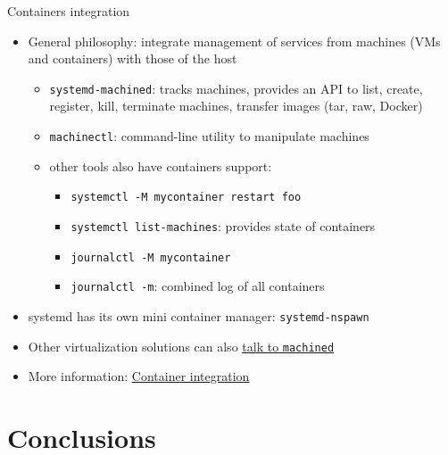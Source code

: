 \documentclass[11pt,final,usepdftitle=false]{beamer}
\begin{document}
\begin{frame}{Containers integration}
\begin{itemize}
	\item General philosophy: \alert{integrate management of services from machines (VMs and containers) with those of the host}
	\begin{itemize}
		\item \texttt{systemd-machined}: tracks machines, provides an API to list, create, register, kill, terminate machines, transfer images (tar, raw, Docker)
			\hbr
		\item \texttt{machinectl}: command-line utility to manipulate machines
			\hbr
		\item other tools also have containers support:
			\begin{itemize}
				\item \texttt{systemctl -M mycontainer restart foo}
				\item \texttt{systemctl list-machines}: provides state of containers
				\item \texttt{journalctl -M mycontainer}
				\item \texttt{journalctl -m}: combined log of all containers
			\end{itemize}
	\end{itemize}
\hbr
\item systemd has its own mini container manager: \texttt{systemd-nspawn}
\hbr
\item Other virtualization solutions can also \href{http://www.freedesktop.org/wiki/Software/systemd/machined/}{\ul{talk to \texttt{machined}}}
\hbr
\item More information: \href{http://0pointer.net/blog/systemd-for-administrators-part-xxi.html}{\ul{Container integration}}
\end{itemize}
\end{frame}

\section{Conclusions}
\end{document}
